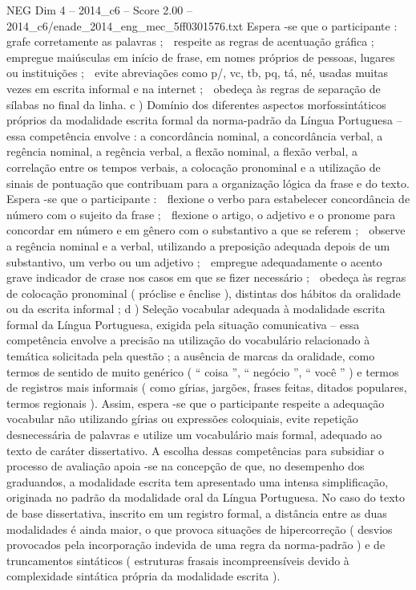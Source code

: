 \begin{textsample}{NEG Dim 4 – 2014\_c6 – Score 2.00 – 2014\_c6/enade\_2014\_eng\_mec\_5ff0301576.txt}
Espera -se que o participante :  grafe corretamente as palavras ;  respeite as regras de acentuação gráfica ;  empregue maiúsculas em início de frase, em nomes próprios de pessoas, lugares ou instituições ;  evite abreviações como p/, vc, tb, pq, tá, né, usadas muitas vezes em escrita informal e na internet ;  obedeça às regras de separação de sílabas no final da linha. c ) Domínio dos diferentes aspectos morfossintáticos próprios da modalidade escrita formal da norma-padrão da Língua Portuguesa – essa competência envolve : a concordância nominal, a concordância verbal, a regência nominal, a regência verbal, a flexão nominal, a flexão verbal, a correlação entre os tempos verbais, a colocação pronominal e a utilização de sinais de pontuação que contribuam para a organização lógica da frase e do texto.
Espera -se que o participante :  flexione o verbo para estabelecer concordância de número com o sujeito da frase ;  flexione o artigo, o adjetivo e o pronome para concordar em número e em gênero com o substantivo a que se referem ;  observe a regência nominal e a verbal, utilizando a preposição adequada depois de um substantivo, um verbo ou um adjetivo ;  empregue adequadamente o acento grave indicador de crase nos casos em que se fizer necessário ;  obedeça às regras de colocação pronominal ( próclise e ênclise ), distintas dos hábitos da oralidade ou da escrita informal ; d ) Seleção vocabular adequada à modalidade escrita formal da Língua Portuguesa, exigida pela situação comunicativa – essa competência envolve a precisão na utilização do vocabulário relacionado à temática solicitada pela questão ; a ausência de marcas da oralidade, como termos de sentido de muito genérico ( “ coisa ”, “ negócio ”, “ você ” ) e termos de registros mais informais ( como gírias, jargões, frases feitas, ditados populares, termos regionais ).
Assim, espera -se que o participante respeite a adequação vocabular não utilizando gírias ou expressões coloquiais, evite repetição desnecessária de palavras e utilize um vocabulário mais formal, adequado ao texto de caráter dissertativo.
A escolha dessas competências para subsidiar o processo de avaliação apoia -se na concepção de que, no desempenho dos graduandos, a modalidade escrita tem apresentado uma intensa simplificação, originada no padrão da modalidade oral da Língua Portuguesa.
No caso do texto de base dissertativa, inscrito em um registro formal, a distância entre as duas modalidades é ainda maior, o que provoca situações de hipercorreção ( desvios provocados pela incorporação indevida de uma regra da norma-padrão ) e de truncamentos sintáticos ( estruturas frasais incompreensíveis devido à complexidade sintática própria da modalidade escrita ).

\end{textsample}
